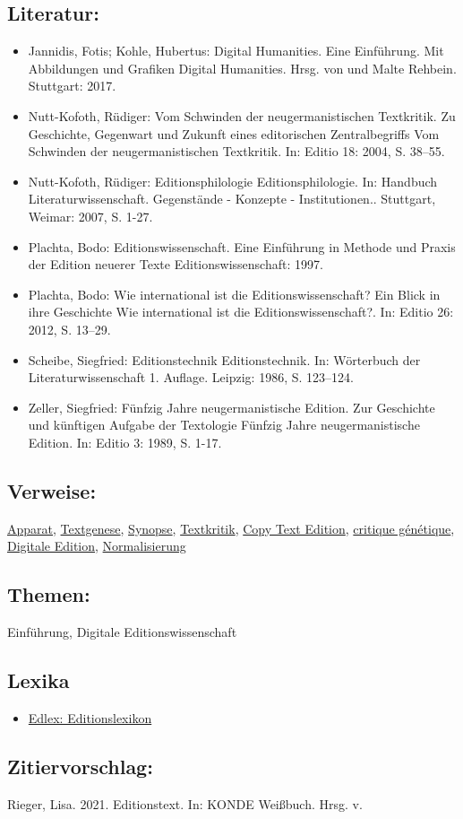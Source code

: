 \documentclass{article}
\begin{document}
        \subsection*{Literatur:}\begin{itemize}\item Jannidis, Fotis; Kohle, Hubertus: Digital Humanities. Eine Einführung. Mit Abbildungen und Grafiken Digital Humanities. Hrsg. von  und Malte Rehbein. Stuttgart: 2017.\item Nutt-Kofoth, Rüdiger: Vom Schwinden der neugermanistischen Textkritik. Zu Geschichte, Gegenwart und Zukunft eines editorischen Zentralbegriffs Vom Schwinden der neugermanistischen Textkritik. In: Editio 18: 2004, S. 38–55.\item Nutt-Kofoth, Rüdiger: Editionsphilologie Editionsphilologie. In: Handbuch Literaturwissenschaft. Gegenstände - Konzepte - Institutionen.. Stuttgart, Weimar: 2007, S. 1-27.\item Plachta, Bodo: Editionswissenschaft. Eine Einführung in Methode und Praxis der Edition neuerer Texte Editionswissenschaft: 1997.\item Plachta, Bodo: Wie international ist die Editionswissenschaft? Ein Blick in ihre Geschichte Wie international ist die Editionswissenschaft?. In: Editio 26: 2012, S. 13–29.\item Scheibe, Siegfried: Editionstechnik Editionstechnik. In: Wörterbuch der Literaturwissenschaft 1. Auflage. Leipzig: 1986, S. 123–124.\item Zeller, Siegfried: Fünfzig Jahre neugermanistische Edition. Zur Geschichte und künftigen Aufgabe der Textologie Fünfzig Jahre neugermanistische Edition. In: Editio 3: 1989, S. 1-17.\end{itemize}\subsection*{Verweise:}\href{https://gams.uni-graz.at/o:konde.32}{Apparat}, \href{https://gams.uni-graz.at/o:konde.28}{Textgenese}, \href{https://gams.uni-graz.at/o:konde.174}{Synopse}, \href{https://gams.uni-graz.at/o:konde.192}{Textkritik}, \href{https://gams.uni-graz.at/o:konde.43}{Copy Text Edition}, \href{https://gams.uni-graz.at/o:konde.46}{critique génétique}, \href{https://gams.uni-graz.at/o:konde.59}{Digitale Edition}, \href{https://gams.uni-graz.at/o:konde.146}{Normalisierung}\subsection*{Themen:}Einführung, Digitale Editionswissenschaft\subsection*{Lexika}\begin{itemize}\item \href{https://edlex.de/index.php?title=Edierter_Text}{Edlex: Editionslexikon}\end{itemize}\subsection*{Zitiervorschlag:}Rieger, Lisa. 2021. Editionstext. In: KONDE Weißbuch. Hrsg. v. 
\end{document}
